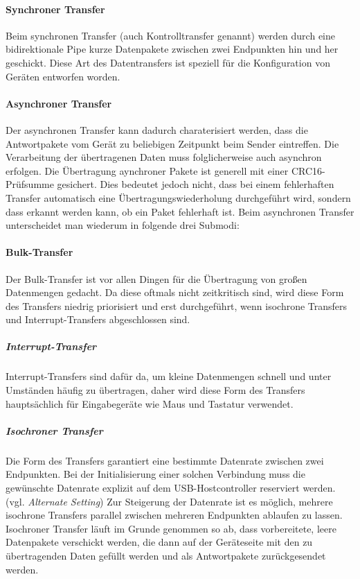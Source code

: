 \paragraph{Synchroner Transfer}
Beim synchronen Transfer (auch Kontrolltransfer genannt) werden durch eine bidirektionale Pipe kurze Datenpakete zwischen zwei Endpunkten hin und her geschickt.
Diese Art des Datentransfers ist speziell für die Konfiguration von Geräten entworfen worden.

\paragraph{Asynchroner Transfer}
Der asynchronen Transfer kann dadurch charaterisiert werden, dass die Antwortpakete vom Gerät zu beliebigen Zeitpunkt beim Sender eintreffen.
Die Verarbeitung der übertragenen Daten muss folglicherweise auch asynchron erfolgen.
Die Übertragung aynchroner Pakete ist generell mit einer CRC16-Prüfsumme gesichert.
Dies bedeutet jedoch nicht, dass bei einem fehlerhaften Transfer automatisch eine Übertragungswiederholung durchgeführt wird, sondern dass erkannt werden kann, ob ein Paket fehlerhaft ist.
Beim asynchronen Transfer unterscheidet man wiederum in folgende drei Submodi:

\paragraph*{Bulk-Transfer}
Der Bulk-Transfer ist vor allen Dingen für die Übertragung von großen Datenmengen gedacht.
Da diese oftmals nicht zeitkritisch sind, wird diese Form des Transfers niedrig priorisiert und erst durchgeführt, wenn isochrone Transfers und Interrupt-Transfers abgeschlossen sind.

\subparagraph{Interrupt-Transfer}
Interrupt-Transfers sind dafür da, um kleine Datenmengen schnell und unter Umständen häufig zu übertragen, daher wird diese Form des Transfers hauptsächlich für Eingabegeräte wie Maus und Tastatur verwendet.

\subparagraph{Isochroner Transfer}
Die Form des Transfers garantiert eine bestimmte Datenrate zwischen zwei Endpunkten.
Bei der Initialisierung einer solchen Verbindung muss die gewünschte Datenrate explizit auf dem USB-Hostcontroller reserviert werden. (vgl. \emph{Alternate Setting})
Zur Steigerung der Datenrate ist es möglich, mehrere isochrone Transfers parallel zwischen mehreren Endpunkten ablaufen zu lassen.
Isochroner Transfer läuft im Grunde genommen so ab, dass vorbereitete, leere Datenpakete verschickt werden, die dann auf der Geräteseite mit den zu übertragenden Daten gefüllt werden und als Antwortpakete zurückgesendet werden.

